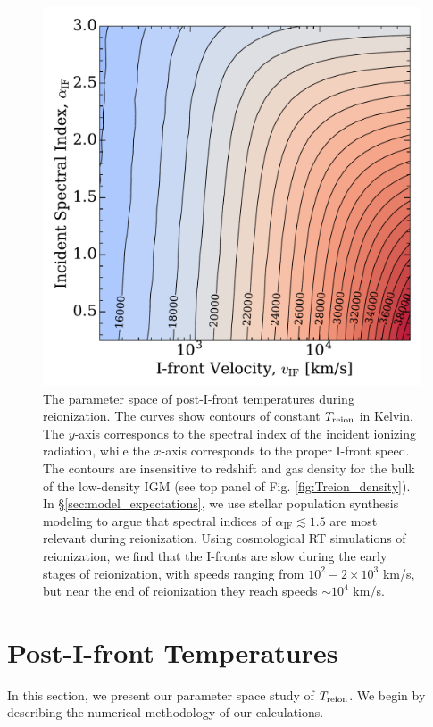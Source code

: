 \documentclass[twocolumn]{aastex62}
\newcommand{\Treion}{T_{\rm reion}}
\newcommand{\spec}{\alpha_{\mathrm{IF}}}
\begin{document}
\begin{figure}
\centerline{
\includegraphics[width=14cm]{fig2.pdf}
}
\caption{The parameter space of post-I-front temperatures during reionization.  The curves show contours of constant $\Treion$ in Kelvin.  The $y$-axis corresponds to the spectral index of the incident ionizing radiation, while the $x$-axis corresponds to the proper I-front speed.  The contours are insensitive to redshift and gas density for the bulk of the low-density IGM (see top panel of Fig. \ref{fig:Treion_density}).  In \S \ref{sec:model_expectations}, we use stellar population synthesis modeling to argue that spectral indices of $\spec \lesssim 1.5$ are most relevant during reionization. Using cosmological RT simulations of reionization, we find that the I-fronts are slow during the early stages of reionization, with speeds ranging from $10^2 - 2\times10^3$ km/s, but near the end of reionization they reach speeds $\sim 10^4$ km/s.     }
\label{fig:Treion_contour}
\end{figure}

\section{Post-I-front Temperatures}
\label{sec:post-I-front}

In this section, we present our parameter space study of $\Treion$. We begin by describing the numerical methodology of our calculations.   
\end{document}
